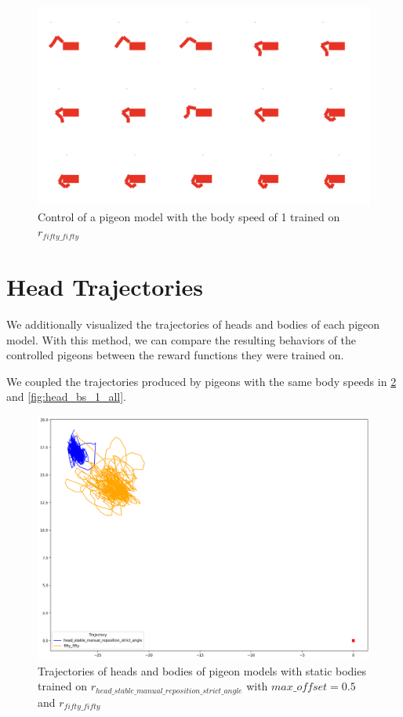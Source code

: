   \begin{figure}[H]
      \centering
      \includegraphics[width=1\textwidth]{figures/frames/frames_005.png}
      \caption{Control of a pigeon model with the body speed of 1 trained on $r_{fifty\_fifty}$}
      \label{fig:fifty_fifty_body_speed_1}
  \end{figure}

\section{Head Trajectories}
  We additionally visualized the trajectories of heads and bodies of each pigeon model. With this method, we can compare the resulting behaviors of the controlled pigeons between the reward functions they were trained on.

  We coupled the trajectories produced by pigeons with the same body speeds in \ref{fig:head_bs_0} and \ref{fig:head_bs_1_all}.

  \begin{figure}[H]
      \centering
      \includegraphics[width=1\textwidth]{figures/head_tracking_results/pigeon_bs_0.png}
      \caption{Trajectories of heads and bodies of pigeon models with static bodies trained on $r_{head\_stable\_manual\_reposition\_strict\_angle}$ with $max\_offset = 0.5$ and $r_{fifty\_fifty}$}
      \label{fig:head_bs_0}
  \end{figure}

